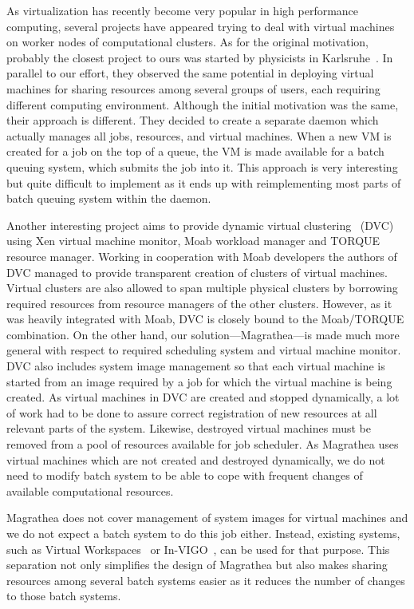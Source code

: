 \documentclass{sigplanconf}
\begin{document}
As virtualization has recently become very popular in high performance
computing, several projects have appeared trying to deal with virtual machines
on worker nodes of computational clusters. As for the original motivation,
probably the closest project to ours was started by physicists in
Karlsruhe~\cite{karlsruhe}. In parallel to our effort, they observed the same
potential in deploying virtual machines for sharing resources among several
groups of users, each requiring different computing environment. Although the
initial motivation was the same, their approach is different. They decided to
create a separate daemon which actually manages all jobs, resources, and
virtual machines. When a new VM is created for a job on the top of a queue,
the VM is made available for a batch queuing system, which submits the job
into it. This approach is very interesting but quite difficult to implement as
it ends up with reimplementing most parts of batch queuing system within the
daemon.

Another interesting project aims to provide dynamic virtual
clustering~\cite{dvc} (DVC) using Xen virtual machine monitor, Moab workload
manager and TORQUE resource manager. Working in cooperation with Moab
developers the authors of DVC managed to provide transparent creation of
clusters of virtual machines. Virtual clusters are also allowed to span
multiple physical clusters by borrowing required resources from resource
managers of the other clusters. However, as it was heavily integrated with
Moab, DVC is closely bound to the Moab/TORQUE combination. On the other hand,
our solution---Magrathea---is made much more general with respect to required
scheduling system and virtual machine monitor. DVC also includes system image
management so that each virtual machine is started from an image required by a
job for which the virtual machine is being created. As virtual machines in DVC
are created and stopped dynamically, a lot of work had to be done to assure
correct registration of new resources at all relevant parts of the system.
Likewise, destroyed virtual machines must be removed from a pool of resources
available for job scheduler. As Magrathea uses virtual machines which are not
created and destroyed dynamically, we do not need to modify batch system to be
able to cope with frequent changes of available computational resources.

Magrathea does not cover management of system images for virtual machines and
we do not expect a batch system to do this job either. Instead, existing
systems, such as Virtual Workspaces~\cite{workspaces} or
In-VIGO~\cite{invigo}, can be used for that purpose. This separation not only
simplifies the design of Magrathea but also makes sharing resources among
several batch systems easier as it reduces the number of changes to those
batch systems.
\end{document}

